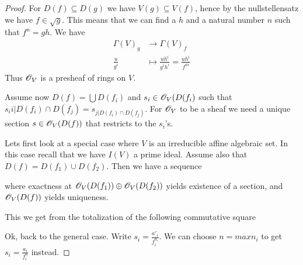 \begin{proof}
For $D(f)\subseteq D(g)$ we have $V(g)\subseteq V(f)$, hence by the nullstellensatz we have $f\in \sqrt{g}$. This means that we can find a $h$ and a natural number $n$ such that $f^n=gh$. We have 
\begin{align*}
    \Gamma(V)_g &\longrightarrow \Gamma(V)_f \\
    \frac{u}{g^i}&\longmapsto \frac{uh^i}{g^i h^i} = \frac{uh^i}{f^{ni}}
\end{align*}
Thus $\mathscr{O}_V$ is a presheaf of rings on $V$. 

Assume now $D(f)=\bigcup D(f_i)$ and $s_i\in \mathscr{O}_V(D(f_i)$ such that $s_i{i\vert D(f_i)\cap D(f_j)} = s_{j\vert D(f_i)\cap D(f_j)}$. For $\mathscr{O}_V$ to be a sheaf we need a unique section $s\in \mathscr{O}_V(D(f))$ that restricts to the $s_i$'s. 

Lets first look at a special case where $V$ is an irreducible affine algebraic set. In this case recall that we have $I(V)$ a prime ideal. Assume also that $D(f)=D(f_1)\cup D(f_2)$. Then we have a sequence 
\begin{center}
\end{center}
where exactness at $\mathscr{O}_V(D(f_1))\oplus \mathscr{O}_V(D(f_2))$ yields existence of a section, and $\mathscr{O}_V(D(f))$ yields uniqueness. 

This we get from the totalization of the following commutative square
\begin{center}
\end{center}

Ok, back to the general case. Write $s_i=\frac{a'_i}{f_i^{n_i}}$. We can choose $n=max{n_i}$ to get $s_i = \frac{a_i}{f_i^n}$ instead. 


\end{proof}
